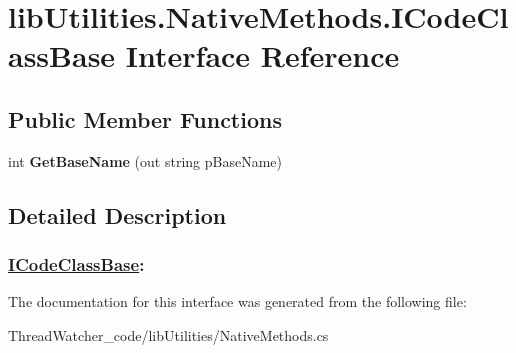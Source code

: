 \hypertarget{interfacelib_utilities_1_1_native_methods_1_1_i_code_class_base}{\section{lib\+Utilities.\+Native\+Methods.\+I\+Code\+Class\+Base Interface Reference}
\label{interfacelib_utilities_1_1_native_methods_1_1_i_code_class_base}
}
\subsection*{Public Member Functions}
\begin{DoxyCompactItemize}
\item 
\hypertarget{interfacelib_utilities_1_1_native_methods_1_1_i_code_class_base_a23c3e55aee32efe220d2c2976138cf38}{int {\bfseries Get\+Base\+Name} (out string p\+Base\+Name)}\label{interfacelib_utilities_1_1_native_methods_1_1_i_code_class_base_a23c3e55aee32efe220d2c2976138cf38}

\end{DoxyCompactItemize}


\subsection{Detailed Description}


 \subsubsection*{\hyperlink{interfacelib_utilities_1_1_native_methods_1_1_i_code_class_base}{I\+Code\+Class\+Base}\+: }

The documentation for this interface was generated from the following file\+:\begin{DoxyCompactItemize}
\item 
Thread\+Watcher\+\_\+code/lib\+Utilities/Native\+Methods.\+cs\end{DoxyCompactItemize}
